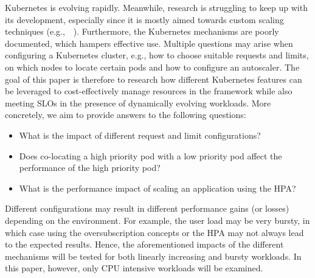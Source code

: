 Kubernetes is evolving rapidly. Meanwhile, research is struggling to keep up with its development, especially since it is mostly aimed towards custom scaling techniques (e.g.,~\citep{hyscale}~\citep{caravel}). Furthermore, the Kubernetes mechanisms are poorly documented, which hampers effective use. Multiple questions may arise when configuring a Kubernetes cluster, e.g., how to choose suitable requests and limits, on which nodes to locate certain pods and how to configure an autoscaler. 
The goal of this paper is therefore to research how different Kubernetes features can be leveraged to cost-effectively manage resources in the framework while also meeting SLOs in the presence of dynamically evolving workloads. More concretely, we aim to provide answers to the following questions:
\begin{itemize}[noitemsep]
    \itemsep0em 
    \item What is the impact of different request and limit configurations?
    \item Does co-locating a high priority pod with a low priority pod affect the performance of the high priority pod?
    \item What is the performance impact of scaling an application using the HPA?
\end{itemize}

Different configurations may result in different performance gains (or losses) depending on the environment. For example, the user load may be very bursty, in which case using the oversubscription concepts or the HPA may not always lead to the expected results. Hence, the aforementioned impacts of the different mechanisms will be tested for both linearly increasing and bursty workloads. In this paper, however, only CPU intensive workloads will be examined. 


